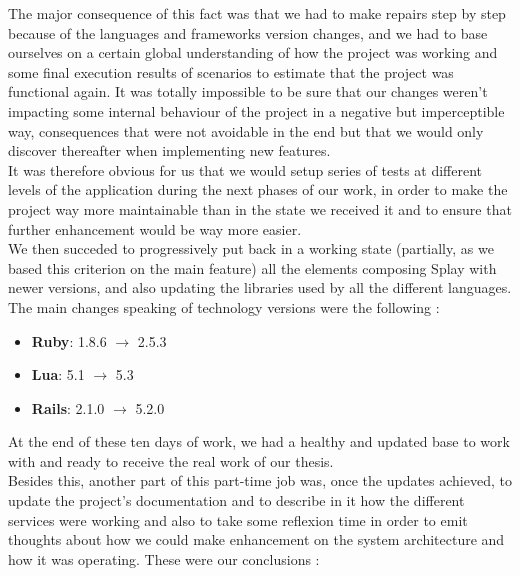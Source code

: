 \documentclass{eplmastersthesis}
\begin{document}
        The major consequence of this fact was that we had to make repairs
        step by step because of the languages and frameworks version changes,
        and we had to base ourselves on a certain global understanding of how
        the project was working and some final execution results of scenarios
        to estimate that the project was functional again. It was totally
        impossible to be sure that our changes weren't impacting some internal
        behaviour of the project in a negative but imperceptible way,
        consequences that were not avoidable in the end but that we would
        only discover thereafter when implementing new features.\\
        It was therefore obvious for us that we would setup series of tests
        at different levels of the application during the next phases of our
        work, in order to make the project way more maintainable than in the
        state we received it and to ensure that further enhancement would
        be way more easier.\\


        We then succeded to progressively put back in a working state
        (partially, as we based this criterion on the main feature) all the
        elements composing Splay with newer versions, and also updating the
        libraries used by all the different languages. The main changes
        speaking of technology versions were the following :

        \begin{itemize}
          \item \textbf{Ruby}: 1.8.6 $\rightarrow$ 2.5.3
          \item \textbf{Lua}: 5.1 $\rightarrow$ 5.3
          \item \textbf{Rails}: 2.1.0 $\rightarrow$ 5.2.0
        \end{itemize}

        At the end of these ten days of work, we had a healthy and updated
        base to work with and ready to receive the real work of our thesis.\\

        Besides this, another part of this part-time job was, once the updates
        achieved, to update the project's documentation and to describe in
        it how the different services were working and also to take some
        reflexion time in order to emit thoughts about how we could make
        enhancement on the system architecture and how it was operating. These
        were our conclusions :
\end{document}
